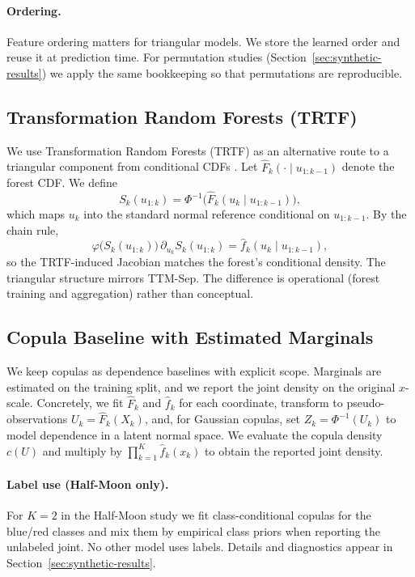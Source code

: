 \documentclass[11pt,a4paper,twoside]{book}\usepackage[]{graphicx}\usepackage[]{xcolor}
\begin{document}
\paragraph{Ordering.} Feature ordering matters for triangular models. We store the learned order and reuse it at prediction time. For permutation studies (Section~\ref{sec:synthetic-results}) we apply the same bookkeeping so that permutations are reproducible.



\subsection{Transformation Random Forests (TRTF)}

We use Transformation Random Forests (TRTF) as an alternative route to a triangular component from conditional CDFs \citep{hothorn2017transformation,hothorn2018conditional}. Let $\widehat{F}_k(\cdot \mid u_{1:k-1})$ denote the forest CDF. We define
\begin{equation}
 S_k(u_{1:k}) = \Phi^{-1}\!\big(\widehat{F}_k(u_k \mid u_{1:k-1})\big),
 \label{eq:trtf-transport}
\end{equation}
which maps $u_k$ into the standard normal reference conditional on $u_{1:k-1}$. By the chain rule,
\[
 \varphi\big(S_k(u_{1:k})\big)\, \partial_{u_k} S_k(u_{1:k}) = \widehat{f}_k(u_k \mid u_{1:k-1}),
\]
so the TRTF-induced Jacobian matches the forest’s conditional density. The triangular structure mirrors TTM-Sep. The difference is operational (forest training and aggregation) rather than conceptual.

\subsection{Copula Baseline with Estimated Marginals}

We keep copulas as dependence baselines with explicit scope. Marginals are estimated on the training split, and we report the joint density on the original $x$-scale. Concretely, we fit $\widehat{F}_k$ and $\widehat{f}_k$ for each coordinate, transform to pseudo-observations $U_k = \widehat{F}_k(X_k)$, and, for Gaussian copulas, set $Z_k = \Phi^{-1}(U_k)$ to model dependence in a latent normal space. We evaluate the copula density $c(U)$ and multiply by $\prod_{k=1}^K \widehat{f}_k(x_k)$ to obtain the reported joint density.

\paragraph{Label use (Half-Moon only).} For $K=2$ in the Half-Moon study we fit class-conditional copulas for the blue/red classes and mix them by empirical class priors when reporting the unlabeled joint. No other model uses labels. Details and diagnostics appear in Section~\ref{sec:synthetic-results}.
\end{document}
